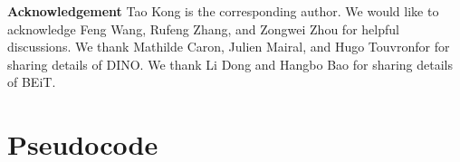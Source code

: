 \documentclass{article} %
\begin{document}
\textbf{Acknowledgement} Tao Kong is the corresponding author. We would like to acknowledge Feng Wang, Rufeng Zhang, and Zongwei Zhou for helpful discussions. We thank Mathilde Caron, Julien Mairal, and Hugo Touvronfor for sharing details of DINO. We thank Li Dong and Hangbo Bao for sharing details of BEiT. 









\newpage
\appendix

\section{Pseudocode}
\label{sec:code}
\end{document}
